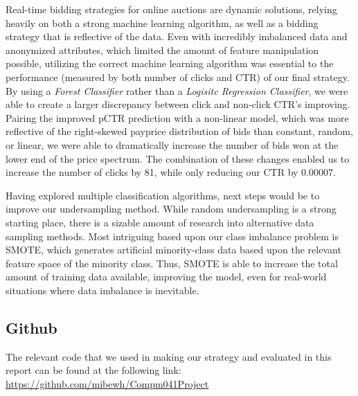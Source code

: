 \documentclass{sig-alternate-05-2015}
\begin{document}
Real-time bidding strategies for online auctions are dynamic solutions, relying heavily on both a strong machine learning algorithm, as well as a bidding strategy that is reflective of the data. Even with incredibly imbalanced data and anonymized attributes, which limited the amount of feature manipulation possible, utilizing the correct machine learning algorithm was essential to the performance (measured by both number of clicks and CTR) of our final strategy. By using a \textit{Forest Classifier} rather than a \textit{Logisitc Regression Classifier}, we were able to create a larger discrepancy between click and non-click CTR's improving. Pairing the improved pCTR prediction with a non-linear model, which was more reflective of the right-skewed payprice distribution of bids than constant, random, or linear, we were able to dramatically increase the number of bids won at the lower end of the price spectrum.  The combination of these changes enabled us to increase the number of clicks by 81, while only reducing our CTR by 0.00007.

Having explored multiple classification algorithms, next steps would be to improve our undersampling method.  While random undersampling is a strong starting place, there is a sizable amount of research into alternative data sampling methods. Most intriguing based upon our class imbalance problem is SMOTE, which generates artificial minority-class data based upon the relevant feature space of the minority class. Thus, SMOTE is able to increase the total amount of training data available, improving the model, even for real-world situations where data imbalance is inevitable.

\subsection{Github}
The relevant code that we used in making our strategy and evaluated in this report can be found at the following link:
\underline{\url{https://github.com/mibewh/Compm041Project}}
\end{document}
